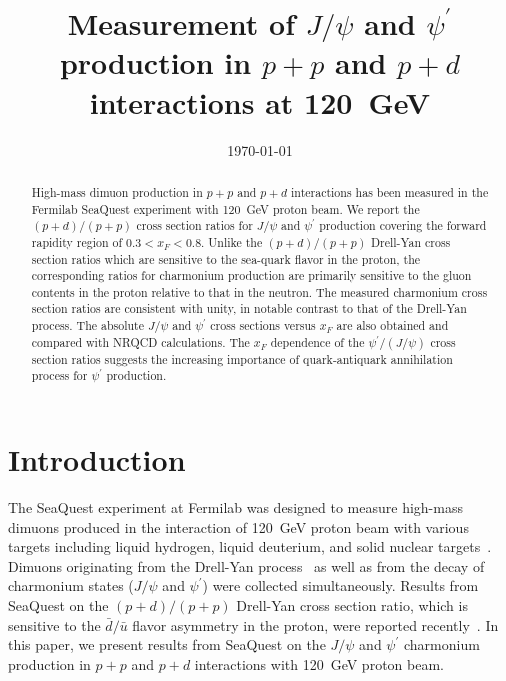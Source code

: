 \documentclass[reprint,aps,unsortedaddress,superscriptaddress,prd,floatfix,showpacs,linenumbers]{revtex4-2}
\begin{document}
\title{Measurement of $J/\psi$ and $\psi^\prime$ production in $p+p$ and
$p+d$ interactions at \SI{120}{\GeV}}

\date{\today}

\begin{abstract}
High-mass dimuon production in $p+p$ and $p+d$ interactions has been measured
in the Fermilab SeaQuest experiment with \SI{120}{\GeV} proton beam. 
We report the $(p+d) / (p+p)$ cross section
ratios for $J/\psi$ and $\psi^\prime$ production covering the forward
rapidity region of $0.3 < x_F <0.8$. Unlike the  
$(p+d) / (p+p)$ Drell-Yan cross section ratios which are 
sensitive to the sea-quark flavor in the proton, the corresponding
ratios for charmonium production are primarily 
sensitive to the gluon contents in the proton relative to that in the
neutron. The measured charmonium cross section ratios are consistent with 
unity, in notable contrast to that of the Drell-Yan process. 
The absolute $J/\psi$ and
$\psi^\prime$ cross sections versus $x_F$ 
are also obtained and compared with NRQCD calculations. The $x_F$ dependence
of the $\psi^\prime / (J/\psi)$ cross section ratios suggests the increasing
importance of quark-antiquark annihilation process for $\psi^\prime$ 
production. 
\end{abstract}


\maketitle

\section{Introduction}

The SeaQuest experiment at Fermilab was designed to measure high-mass dimuons
produced in the interaction of \SI{120}{\GeV} proton beam with various targets
including liquid hydrogen, liquid deuterium, and solid nuclear 
targets~\cite{aidala2019}. Dimuons
originating from the Drell-Yan process~\cite{drell1970} as well as from the 
decay of charmonium 
states ($J/\psi$ and $\psi^\prime$) were collected simultaneously. 
Results from SeaQuest on the $(p+d) / (p+p)$ Drell-Yan cross section ratio, 
which is sensitive
to the $\bar d / \bar u$ flavor asymmetry in the proton, were reported
recently~\cite{dove2021,dove2023}. In this paper, we present results from
SeaQuest on the $J/\psi$ and $\psi^\prime$ charmonium production in $p+p$
and $p+d$ interactions with \SI{120}{\GeV} proton beam.
\end{document}
